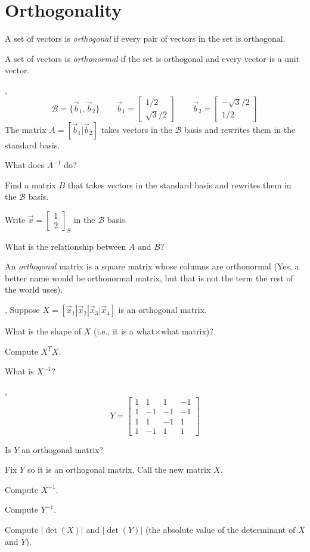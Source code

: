 \documentclass[letter]{article}
\newcommand{\mat}[1]{\begin{bmatrix}#1\end{bmatrix}}
\begin{document}
\section*{Orthogonality}
	\begin{Def}
		A set of vectors is \emph{orthogonal} if every pair of vectors
		in the set is orthogonal.
	\end{Def}

	\begin{Def}
		A set of vectors is \emph{orthonormal} if the set is orthogonal
		and every vector is a unit vector.
	\end{Def}

	\sep
	\[
		\mathcal B=\{\vec b_1,\vec b_2\}\qquad\vec b_1=\mat{1/2\\\sqrt{3}/2}
		\qquad \vec b_2=\mat{-\sqrt{3}/2\\1/2}
	\]
	The matrix $A=[\vec b_1|\vec b_2]$ takes vectors in the $\mathcal B$ basis
	and rewrites them in the standard basis.
	\begin{Enum}
		\item What does $A^{-1}$ do?
		\item Find a matrix $B$ that takes vectors in the standard basis
			and rewrites them in the $\mathcal B$ basis.
		\item Write $\vec x=\mat{1\\2}_S$ in the $\mathcal B$ basis.
		\item What is the relationship between $A$ and $B$?
	\end{Enum}

	\begin{Def}
		An \emph{orthogonal} matrix is a square matrix whose columns are
		orthonormal (Yes, a better name would be orthonormal matrix, but that
		is not the term the rest of the world uses).
	\end{Def}

	\sep
	Suppose $X=[\vec x_1|\vec x_2|\vec x_3|\vec x_4]$ is an orthogonal matrix.
	\begin{Enum}
		\item What is the shape of $X$ (i.e., it is a what$\times$what matrix)?
		\item Compute $X^TX$.
		\item What is $X^{-1}$?
	\end{Enum}

	\sep
	\[
		Y=\mat{1&1&1&-1\\1&-1&-1&-1\\1&1&-1&1\\1&-1&1&1}
	\]
	\begin{Enum}
		\item Is $Y$ an orthogonal matrix?
		\item Fix $Y$ so it is an orthogonal matrix.  Call the new matrix $X$.
		\item Compute $X^{-1}$.
		\item Compute $Y^{-1}$.
		\item Compute $|\det(X)|$ and $|\det(Y)|$ (the absolute value of
			the determinant of $X$ and $Y$).
	\end{Enum}
\end{document}
